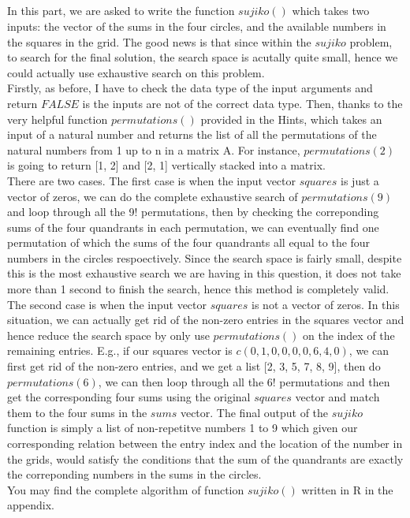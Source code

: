 \documentclass[12pt]{article}\usepackage[]{graphicx}\usepackage[]{color}
\begin{document}
\subsection{}
In this part, we are asked to write the function $sujiko()$ which takes two inputs: the vector of the sums in the four circles, and the available numbers in the squares in the grid. The good news is that since within the $sujiko$ problem, to search for the final solution, the search space is acutally quite small, hence we could actually use exhaustive search on this problem.\\
Firstly, as before, I have to check the data type of the input arguments and return $FALSE$ is the inputs are not of the correct data type. Then, thanks to the very helpful function $permutations()$ provided in the Hints, which takes an input of a natural number and returns the list of all the permutations of the natural numbers from 1 up to n in a matrix A. For instance, $permutations(2)$ is going to return [1, 2] and [2, 1] vertically stacked into a matrix. \\
There are two cases. The first case is when the input vector $squares$ is just a vector of zeros, we can do the complete exhaustive search of $permutations(9)$ and loop through all the 9! permutations, then by checking the correponding sums of the four quandrants in each permutation, we can eventually find one permutation of which the sums of the four quandrants all equal to the four numbers in the circles respoectively. Since the search space is fairly small, despite this is the most exhaustive search we are having in this question, it does not take more than 1 second to finish the search, hence this method is completely valid. \\
The second case is when the input vector $squares$ is not a vector of zeros. In this situation, we can actually get rid of the non-zero entries in the squares vector and hence reduce the search space by only use $permutations()$ on the index of the remaining entries. E.g., if our squares vector is $c(0, 1, 0,   0, 0, 0,   6, 4, 0)$, we can first get rid of the non-zero entries, and we get a list [2, 3, 5, 7, 8, 9], then do $permutations(6)$, we can then loop through all the 6! permutations and then get the corresponding four sums using the original $squares$ vector and match them to the four sums in the $sums$ vector. The final output of the $sujiko$ function is simply a list of non-repetitve numbers 1 to 9 which given our corresponding relation between the entry index and the location of the number in the grids, would satisfy the conditions that the sum of the quandrants are exactly the correponding numbers in the sums in the circles.\\
You may find the complete algorithm of function $sujiko()$ written in R in the appendix.
\end{document}
